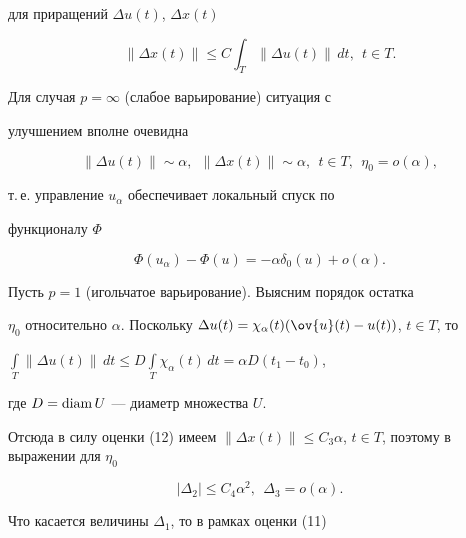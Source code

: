 для приращений $\Delta u(t)$, $\Delta x(t)$


\begin{equation}


\| \Delta x(t)\| \leq C \int_{T} \| \Delta u(t)\|\,dt,


\ \ t \in T.


\end{equation}





Для случая $p = \infty$ (слабое варьирование) ситуация с


улучшением вполне очевидна


$$


\| \Delta u(t)\| \sim \alpha,


\ \ \| \Delta x(t)\| \sim \alpha,\ \ t \in T,\ \ \eta_{0} = o(\alpha),


$$


т.\,е. управление $u_{\alpha}$ обеспечивает локальный спуск по


функционалу $\Phi$


$$


\Phi(u_{\alpha}) - \Phi(u) = - \alpha \delta_{0}(u) + o(\alpha).


$$





Пусть $p = 1$ (игольчатое варьирование). Выясним порядок остатка


$\eta_{0}$ относительно $\alpha.$ Поскольку $ \Delta u(t) =


\chi_{\alpha}(t)(\ov{u}(t) - u(t))$, $t \in T$, то


$\int\limits_{T} \| \Delta u(t)\|\,dt \leq


D \int\limits_{T} \chi_{\alpha}(t)\,dt = \alpha D (t_{1} - t_{0})$,


где $D = \operatorname{diam} U$ --- диаметр множества $U$.


Отсюда в силу оценки (12) имеем $\| \Delta x(t)\| \leq C_{3}


\alpha$, $t \in T$, поэтому в выражении для $\eta_{0}$


\begin{equation}


| \Delta_{2}| \leq C_{4} \alpha^{2},\ \ \Delta_{3} = o(\alpha).


\end{equation}





Что касается величины $\Delta_{1}$, то в рамках оценки (11)


